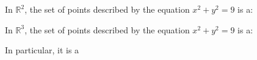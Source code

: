 \documentclass{ximera}
\author{Bart Snapp}
\begin{document}
\begin{exercise}
  In $\mathbb{R}^2$, the set of points described by the equation
  $x^2+y^2=9$ is a:
  \begin{multipleChoice}
  \end{multipleChoice}
  \begin{exercise}
  In $\mathbb{R}^3$, the set of points described by the equation $x^2+y^2=9$
  is a:
  \begin{multipleChoice}
  \end{multipleChoice}
  \begin{exercise}
    In particular, it is a
    \begin{multipleChoice}
    \end{multipleChoice}
  \end{exercise}
\end{exercise}
\end{exercise}
\end{document}
